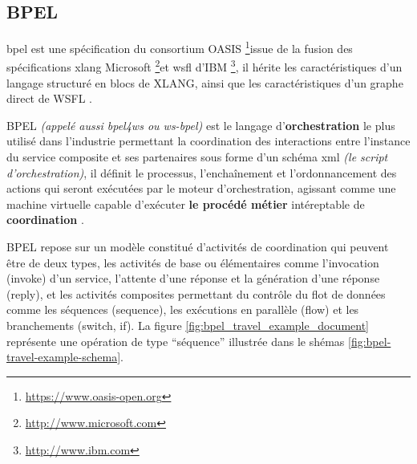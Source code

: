     \subsection{BPEL}
    \label{sec:bpel}

    \acrshort{bpel} est une spécification du consortium OASIS
    \footnote{\url{https://www.oasis-open.org}}issue de la fusion des
    spécifications \acrshort{xlang} Microsoft
    \footnote{\url{http://www.microsoft.com}}et \acrshort{wsfl} d'IBM
    \footnote{\url{http://www.ibm.com}}, il hérite les
    caractéristiques d'un langage structuré en blocs de
    \textsc{XLANG}, ainsi que les caractéristiques d'un graphe direct
    de WSFL \cite{driss2011approche}.

    

    \textsc{BPEL} \textit{(appelé aussi \acrshort{bpel4ws} ou
      \acrshort{ws-bpel})} est le langage d'\textbf{orchestration}
    le plus utilisé dans l'industrie permettant la coordination des
    interactions entre l'instance du service composite et ses
    partenaires sous forme d'un schéma \acrshort{xml} \textit{(le
      script d'orchestration)}, il définit le processus,
    l'enchaînement et l'ordonnancement des actions qui seront
    exécutées par le moteur d'orchestration, agissant comme une
    machine virtuelle capable d'exécuter \textbf{le procédé métier}
    intéreptable de \textbf{coordination} \cite{chollet2009orchestration}.

    \textsc{BPEL} repose sur un modèle constitué d'activités de
    coordination qui peuvent être de deux types, les activités de base
    ou élémentaires comme l'invocation (invoke) d'un service,
    l'attente d'une réponse et la génération d'une réponse (reply), et
    les activités composites permettant du contrôle du flot de données
    comme les séquences (sequence), les exécutions en parallèle (flow)
    et les branchements (switch, if). La figure
    \ref{fig:bpel_travel_example_document} représente une opération de
    type ``séquence'' illustrée dans le shémas
    \ref{fig:bpel-travel-example-schema}.

    
    \newpage


